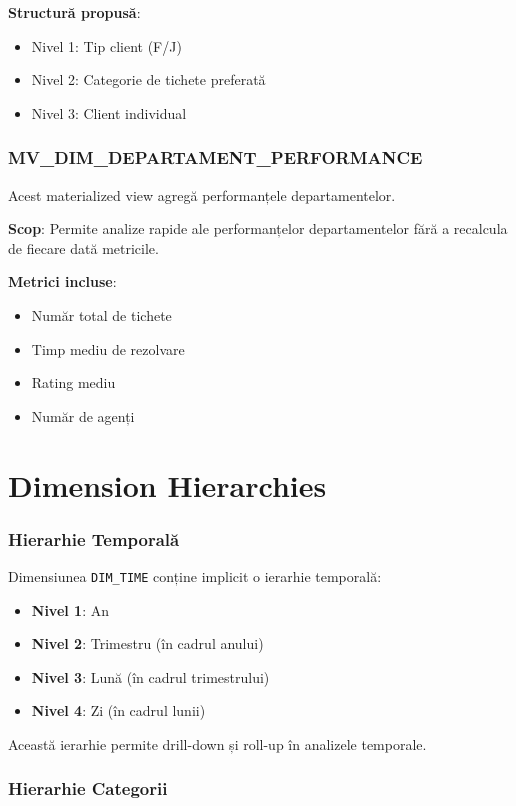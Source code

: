 \textbf{Structură propusă}:
\begin{itemize}
    \item Nivel 1: Tip client (F/J)
    \item Nivel 2: Categorie de tichete preferată
    \item Nivel 3: Client individual
\end{itemize}

\subsubsection{MV\_DIM\_DEPARTAMENT\_PERFORMANCE}

Acest materialized view agregă performanțele departamentelor.

\textbf{Scop}: Permite analize rapide ale performanțelor departamentelor fără a recalcula de fiecare dată metricile.

\textbf{Metrici incluse}:
\begin{itemize}
    \item Număr total de tichete
    \item Timp mediu de rezolvare
    \item Rating mediu
    \item Număr de agenți
\end{itemize}

\section{Dimension Hierarchies}

\subsubsection{Hierarhie Temporală}

Dimensiunea \texttt{DIM\_TIME} conține implicit o ierarhie temporală:
\begin{itemize}
    \item \textbf{Nivel 1}: An
    \item \textbf{Nivel 2}: Trimestru (în cadrul anului)
    \item \textbf{Nivel 3}: Lună (în cadrul trimestrului)
    \item \textbf{Nivel 4}: Zi (în cadrul lunii)
\end{itemize}

Această ierarhie permite drill-down și roll-up în analizele temporale.

\subsubsection{Hierarhie Categorii}

